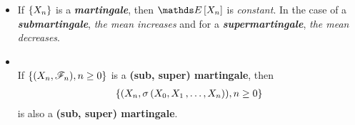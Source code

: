 \documentclass[11pt]{article}
\begin{document}
\begin{itemize}
\item \begin{remark}
If $\left\{X_n\right\}$ is a \emph{\textbf{martingale}}, then $\E{}{X_n}$ is \emph{constant}. In the case of a \emph{\textbf{submartingale}}, \emph{the mean increases} and for a \emph{\textbf{supermartingale}}, \emph{the mean decreases}.
\end{remark}

\item \begin{proposition} \citep{resnick2013probability}\\
If  $\left\{ (X_n, {\mathscr F}_n),  n \ge 0\right\}$ is a \textbf{(sub, super) martingale}, then 
\begin{align*}
\left\{ (X_n, \sigma\left(X_0, X_1 \,{,}\ldots{,}\, X_n\right)),  n \ge 0\right\}
\end{align*} is also a \textbf{(sub, super) martingale}.
\end{proposition}
\end{itemize}
\end{document}
